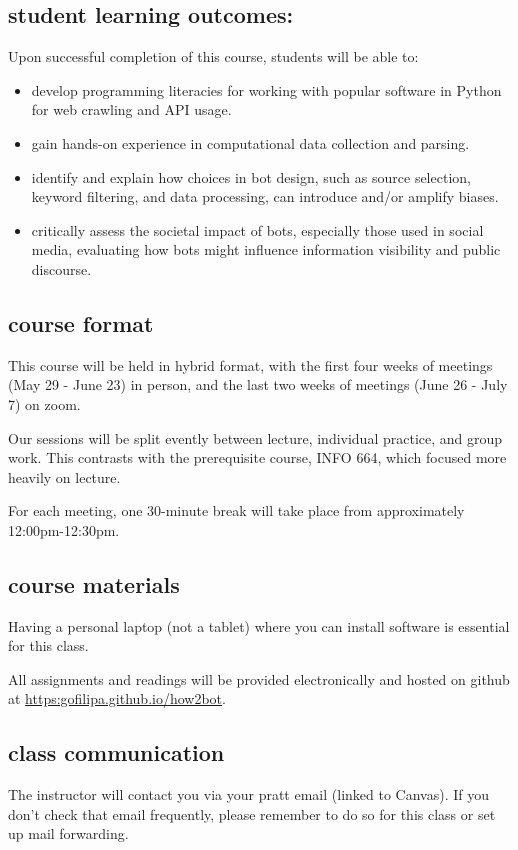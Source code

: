 \documentclass[11pt]{article}
\begin{document}
\subsection{student learning outcomes:}
\label{sec:org93e287f}
Upon successful completion of this course, students will be able to:
\begin{itemize}
\item develop programming literacies for working with popular software in
Python for web crawling and API usage.
\item gain hands-on experience in computational data collection and
parsing.
\item identify and explain how choices in bot design, such as source
selection, keyword filtering, and data processing, can introduce
and/or amplify biases.
\item critically assess the societal impact of bots, especially those used
in social media, evaluating how bots might influence information
visibility and public discourse.
\end{itemize}

\subsection{course format}
\label{sec:org0fb70fe}
This course will be held in hybrid format, with the first four weeks
of meetings (May 29 - June 23) in person, and the last two weeks of
meetings (June 26 - July 7) on zoom.

Our sessions will be split evently between lecture, individual
practice, and group work. This contrasts with the prerequisite course,
INFO 664, which focused more heavily on lecture.

For each meeting, one 30-minute break will take place from
approximately 12:00pm-12:30pm.

\subsection{course materials}
\label{sec:org2356884}
Having a personal laptop (not a tablet) where you can install software
is essential for this class.

All assignments and readings will be provided electronically and
hosted on github at \url{https:gofilipa.github.io/how2bot}.

\subsection{class communication}
\label{sec:orgc735b7f}
The instructor will contact you via your pratt email (linked to
Canvas). If you don't check that email frequently, please remember to
do so for this class or set up mail forwarding.
\end{document}
